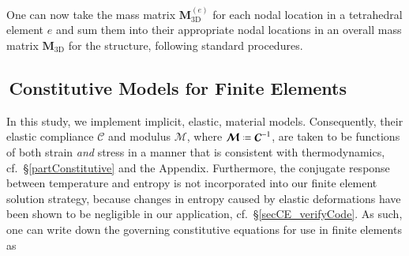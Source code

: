 One can now take the mass matrix $\mathbf{M}^{(e)}_{\mathrm{3D}}$ for each nodal location in a tetrahedral element $e$ and sum them into their appropriate nodal locations in an overall mass matrix $\mathbf{M}_{\mathrm{3D}}$ for the structure, following standard procedures. \cite{ClaytonChung18}


\subsection{$\,$Constitutive Models for Finite Elements}


In this study, we implement implicit, elastic, material models.  Consequently, their elastic compliance $\boldsymbol{\mathcal{C}}$ and modulus $\boldsymbol{\mathcal{M}}$, where $\boldsymbol{\mathcal{M}} \defeq \boldsymbol{\mathcal{C}}^{-1}$, are taken to be functions of both strain \textit{and\/} stress in a manner that is consistent with thermo\-dynamics, cf.\ \S\ref{partConstitutive} and the Appendix.  Furthermore, the conjugate response between temperature and entropy is not incorporated into our finite element solution strategy, because changes in entropy caused by elastic deformations have been shown to be negligible in our application, cf.\ \S\ref{secCE_verifyCode}.  As such, one can write down the governing constitutive equations for use in finite elements as
